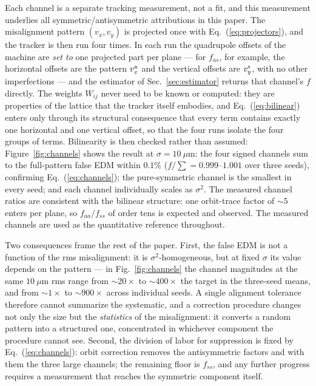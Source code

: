 \documentclass[aps,prab,reprint,superscriptaddress,nofootinbib]{revtex4-2}
\begin{document}
Each channel is a separate tracking measurement, not a fit, and this
measurement underlies all symmetric/antisymmetric attributions in this paper.
The misalignment pattern $(v_x, v_y)$ is projected once with
Eq.~(\ref{eq:projectors}), and the tracker is then run four times.  In each
run the quadrupole offsets of the machine are \emph{set to} one projected
part per plane --- for $f_{as}$, for example, the horizontal offsets are the
pattern $v_x^{\rm a}$ and the vertical offsets are $v_y^{\rm s}$, with no
other imperfections --- and the estimator of Sec.~\ref{sec:estimator} returns
that channel's $f$ directly.  The weights $W_{ij}$ never need to be known or
computed: they are properties of the lattice that the tracker itself
embodies, and Eq.~(\ref{eq:bilinear}) enters only through its structural
consequence that every term contains exactly one horizontal and one vertical
offset, so that the four runs isolate the four groups of terms.  Bilinearity
is then checked rather than assumed:
Figure~\ref{fig:channels} shows the result at $\sigma = 10~\mu$m: the four
signed channels sum to the full-pattern false EDM within $0.1\%$
($f/\!\sum = 0.999$--$1.001$ over three seeds), confirming
Eq.~(\ref{eq:channels}); the pure-symmetric channel is the smallest in every
seed; and each channel individually scales as $\sigma^{2}$.  The measured
channel ratios are consistent with the bilinear structure: one orbit-trace
factor of $\sim\!5$ enters per plane, so $f_{aa}/f_{ss}$ of order tens is
expected and observed.  The measured channels are used as the quantitative
reference throughout.

Two consequences frame the rest of the paper.  First, the false EDM is not a
function of the rms misalignment: it is $\sigma^{2}$-homogeneous, but at fixed
$\sigma$ its value depends on the pattern --- in Fig.~\ref{fig:channels} the
channel magnitudes at the same $10~\mu$m rms range from ${\sim}20\times$ to
${\sim}400\times$ the target in the three-seed means, and from ${\sim}1\times$
to ${\sim}900\times$ across individual seeds.
A single alignment tolerance therefore cannot summarize the systematic, and a
correction procedure changes not only the size but the \emph{statistics} of
the misalignment: it converts a random pattern into a structured one,
concentrated in whichever component the procedure cannot see.  Second, the
division of labor for suppression is fixed by Eq.~(\ref{eq:channels}): orbit
correction removes the antisymmetric factors and with them the three large
channels; the remaining floor is $f_{ss}$, and any further progress requires a
measurement that reaches the symmetric component itself.
\end{document}
